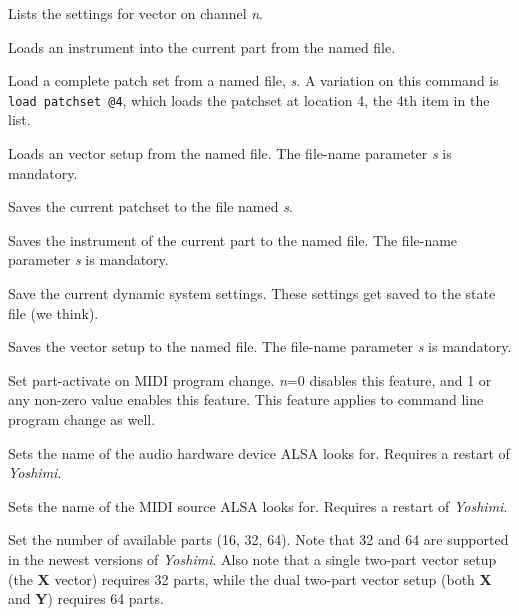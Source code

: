       Lists the settings for vector on channel \textsl{n}.

      Loads an instrument into the current part from the named file.

      Load a complete patch set from a named file, \textsl{s}.
      A variation on this command is \texttt{load patchset @4}, which
      loads the patchset at location 4, the 4th item in the list.

      Loads an vector setup from the named file.
      The file-name parameter \textsl{s} is mandatory.

      Saves the current patchset to the file named \textsl{s}.

      Saves the instrument of the current part to the named file.
      The file-name parameter \textsl{s} is mandatory.

      Save the current dynamic system settings.
      These settings get saved to the state file (we think).

      Saves the vector setup to the named file.
      The file-name parameter \textsl{s} is mandatory.

      Set part-activate on MIDI program change.
      \textsl{n}=0 disables this feature, and
      1 or any non-zero value enables this feature.
      This feature applies to command line program change as well.

      Sets the name of the audio hardware device ALSA looks for.
      Requires a restart of \textsl{Yoshimi}.

      Sets the name of the MIDI source ALSA looks for.
      Requires a restart of \textsl{Yoshimi}.

      Set the number of available parts (16, 32, 64).
      Note that 32 and 64 are supported in the newest versions of
      \textsl{Yoshimi}.  Also note that a single two-part vector setup (the
      \textbf{X} vector) requires 32 parts, while the dual two-part vector
      setup (both \textbf{X} and \textbf{Y}) requires 64 parts.


